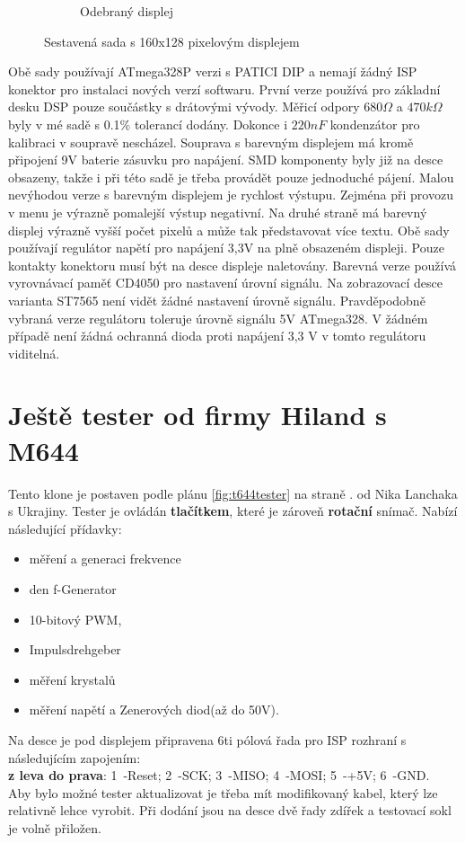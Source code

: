 \begin{figure}[H]
\begin{subfigure}[b]{.5\textwidth}
    \caption{Odebraný displej}
  \end{subfigure}
  \caption{Sestavená sada s 160x128 pixelovým displejem}
  \label{fig:Kit_color}
\end{figure}

Obě sady používají ATmega328P verzi s PATICI DIP a nemají žádný ISP konektor pro instalaci nových
verzí softwaru.
První verze používá pro základní desku DSP pouze součástky s drátovými vývody.
Měřicí odpory \(680\Omega\) a \(470k\Omega\) byly v mé sadě s 0.1\% tolerancí dodány.
Dokonce i \(220 nF\) kondenzátor pro kalibraci v soupravě nescházel.
Souprava s barevným displejem má kromě připojení 9V baterie zásuvku pro napájení.
SMD komponenty byly již na desce obsazeny, takže i při této sadě je třeba provádět pouze jednoduché pájení.
Malou nevýhodou verze s barevným displejem je rychlost výstupu.
Zejména při provozu v menu je výrazně pomalejší výstup negativní.
Na druhé straně má barevný displej výrazně vyšší počet pixelů a může tak představovat více textu.
Obě sady používají regulátor napětí pro napájení 3,3V na plně obsazeném displeji.
Pouze kontakty konektoru musí být na desce displeje naletovány.
Barevná verze používá vyrovnávací paměť CD4050 pro nastavení úrovní signálu.
Na zobrazovací desce varianta ST7565 není vidět žádné nastavení úrovně signálu.
Pravděpodobně vybraná verze regulátoru toleruje úrovně signálu 5V ATmega328.
V žádném případě není žádná ochranná dioda proti napájení 3,3 V v tomto regulátoru viditelná.

\section{Ještě tester od firmy Hiland s M644}
\label{hiland}
Tento  klone je postaven podle plánu \ref{fig:t644tester} na straně \pageref{T644}. od Nika Lanchaka s Ukrajiny.
Tester je ovládán \textbf {tlačítkem}, které je zároveň \textbf {rotační} snímač.
\vspace{0,5cm}
Nabízí následující přídavky:
\vspace{-1.5\baselineskip}
\begin{itemize} \setlength{\itemsep}{-0.5\baselineskip}
 \item měření a generaci frekvence
 \item den f-Generator
 \item 10-bitový PWM,
 \item Impulsdrehgeber
 \item měření krystalů
 \item měření napětí a Zenerových diod(až do 50V).
\end{itemize}
\vspace{-0.5\baselineskip}
Na desce je pod displejem připravena 6ti pólová řada pro ISP rozhraní s následujícím zapojením:\\
\textbf {z leva do prava}: 1~-Reset; 2~-SCK; 3~-MISO; 4~-MOSI; 5~-+5V; 6~-GND.\\
Aby bylo možné tester aktualizovat je třeba mít modifikovaný kabel, který lze relativně lehce vyrobit.
Při dodání jsou na desce dvě řady zdířek a testovací sokl je volně přiložen.

